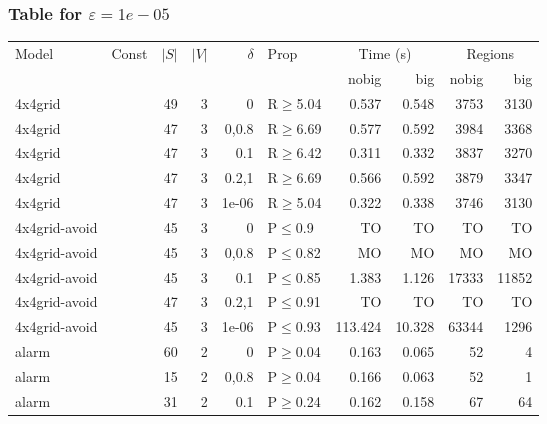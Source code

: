\subsubsection{Table for \(\varepsilon=1e-05\)}
\begin{longtable}{llrrrlrrrr}

        \toprule
        Model & Const & $|S|$ & $|V|$ & $\delta$ & Prop & \multicolumn{2}{c}{Time (s)} & \multicolumn{2}{c}{Regions} \\
        \cmidrule(ll){7-8} \cmidrule(ll){9-10}
        & & & & & & nobig & big & nobig & big \\
        \midrule
        
 4x4grid       &          &     	49 &   3 & 0     & R$\geq$5.04  & 0.537    & 0.548    & 3753    & 3130   \\
 4x4grid       &          &     	47 &   3 & 0,0.8 & R$\geq$6.69  & 0.577    & 0.592    & 3984    & 3368   \\
 4x4grid       &          &     	47 &   3 & 0.1   & R$\geq$6.42  & 0.311    & 0.332    & 3837    & 3270   \\
 4x4grid       &          &     	47 &   3 & 0.2,1 & R$\geq$6.69  & 0.566    & 0.592    & 3879    & 3347   \\
 4x4grid       &          &     	47 &   3 & 1e-06 & R$\geq$5.04  & 0.322    & 0.338    & 3746    & 3130   \\
 4x4grid-avoid &          &     	45 &   3 & 0     & P$\leq$0.9   & TO       & TO       & TO      & TO     \\
 4x4grid-avoid &          &     	45 &   3 & 0,0.8 & P$\leq$0.82  & MO       & MO       & MO      & MO     \\
 4x4grid-avoid &          &     	45 &   3 & 0.1   & P$\leq$0.85  & 1.383    & 1.126    & 17333   & 11852  \\
 4x4grid-avoid &          &     	47 &   3 & 0.2,1 & P$\leq$0.91  & TO       & TO       & TO      & TO     \\
 4x4grid-avoid &          &     	45 &   3 & 1e-06 & P$\leq$0.93  & 113.424  & 10.328   & 63344   & 1296   \\
 alarm         &          &     	60 &   2 & 0     & P$\geq$0.04  & 0.163    & 0.065    & 52      & 4      \\
 alarm         &          &     	15 &   2 & 0,0.8 & P$\geq$0.04  & 0.166    & 0.063    & 52      & 1      \\
 alarm         &          &     	31 &   2 & 0.1   & P$\geq$0.24  & 0.162    & 0.158    & 67      & 64     \\

\end{longtable}
